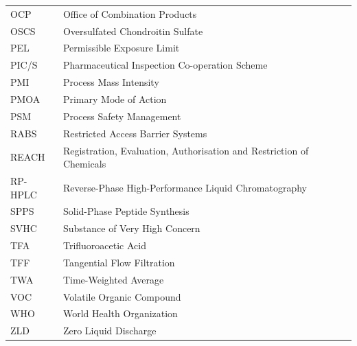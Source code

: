 \begin{longtable}{@{}lp{}@{}}
OCP     & Office of Combination Products \\
OSCS    & Oversulfated Chondroitin Sulfate \\
PEL     & Permissible Exposure Limit \\
PIC/S   & Pharmaceutical Inspection Co-operation Scheme \\
PMI     & Process Mass Intensity \\
PMOA    & Primary Mode of Action \\
PSM     & Process Safety Management \\
RABS    & Restricted Access Barrier Systems \\
REACH   & Registration, Evaluation, Authorisation and Restriction of Chemicals \\
RP-HPLC & Reverse-Phase High-Performance Liquid Chromatography \\
SPPS    & Solid-Phase Peptide Synthesis \\
SVHC    & Substance of Very High Concern \\
TFA     & Trifluoroacetic Acid \\
TFF     & Tangential Flow Filtration \\
TWA     & Time-Weighted Average \\
VOC     & Volatile Organic Compound \\
WHO     & World Health Organization \\
ZLD     & Zero Liquid Discharge \\
\end{longtable}
